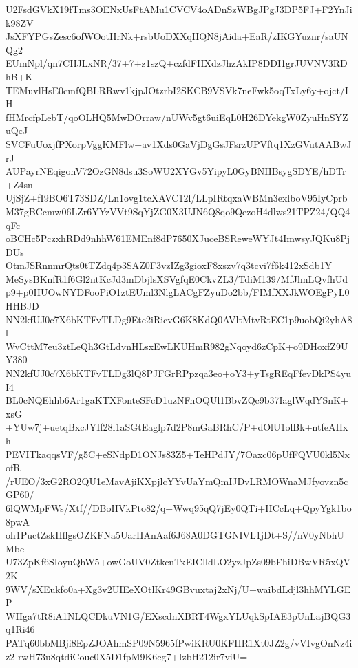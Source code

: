 U2FsdGVkX19fTms3OENxUsFtAMu1CVCV4oADnSzWBgJPgJ3DP5FJ+F2YnJik98ZV
JsXFYPGsZesc6ofWOotHrNk+rsbUoDXXqHQN8jAida+EaR/zIKGYuznr/saUNQg2
EUmNpl/qn7CHJLxNR/37+7+z1szQ+czfdFHXdzJhzAkIP8DDI1grJUVNV3RDhB+K
TEMuvlHsE0cmfQBLRRwv1kjpJOtzrbI2SKCB9VSVk7neFwk5oqTxLy6y+ojct/IH
fHMrcfpLebT/qoOLHQ5MwDOrraw/nUWv5gt6uiEqL0H26DYekgW0ZyuHnSYZuQcJ
SVCFuUoxjfPXorpVggKMFlw+av1Xds0GaVjDgGsJFsrzUPVftq1XzGVutAABwJrJ
AUPayrNEqigonV72OzGN8dsu3SoWU2XYGv5YipyL0GyBNHBsygSDYE/hDTr+Z4sn
UjSjZ+fI9BO6T73SDZ/Ln1ovg1tcXAVC12l/LLpIRtqxaWBMn3exlboV95IyCprb
M37gBCcmw06LZr6YYzVVt9SqYjZG0X3UJN6Q8qo9QezoH4dlws21TPZ24/QQ4qFc
oBCHc5PczxhRDd9nhhW61EMEnf8dP7650XJuceBSReweWYJt4ImwsyJQKu8PjDUs
OtmJSRnnmrQts0tTZdq4p3SAZ0F3vzIZg3gioxF8xszv7q3tcvi7f6k412xSdb1Y
MeSysBKnfR1f6Gl2ntKcJd3mDbjlsXSVgfqE0CkvZL3/TdiM139/MfJhnLQvfhUd
p9+p0HUOwNYDFooPiO1ztEUml3NlgLACgFZyuDo2bb/FIMfXXJkWOEgPyL0HHBJD
NN2kfUJ0c7X6bKTFvTLDg9Etc2iRicvG6K8KdQ0AVltMtvRtEC1p9uobQi2yhA8l
WvCttM7eu3ztLeQh3GtLdvnHLsxEwLKUHmR982gNqoyd6zCpK+o9DHoxfZ9UY380
NN2kfUJ0c7X6bKTFvTLDg3lQ8PJFGrRPpzqa3eo+oY3+yTsgREqFfevDkPS4yuI4
BL0cNQEhhb6Ar1gaKTXFonteSFcD1uzNFnOQUl1BbvZQc9b37IaglWqdYSnK+xsG
+YUw7j+uetqBxcJYIf28l1aSGtEaglp7d2P8mGaBRhC/P+dOlU1olBk+ntfeAHxh
PEVITkaqqsVF/g5C+eSNdpD1ONJs83Z5+TeHPdJY/7Oaxc06pUfFQVU0kl5NxofR
/rUEO/3xG2RO2QU1eMavAjiKXpjlcYYvUaYmQmIJDvLRMOWnaMJfyovzn5cGP60/
6lQWMpFWs/Xtf//DBoHVkPto82/q+Wwq95qQ7jEy0QTi+HCcLq+QpyYgk1bo8pwA
oh1PuctZskHflgsOZKFNa5UarHAnAaf6J68A0DGTGNIVL1jDt+S//nV0yNbhUMbe
U73ZpKf6SIoyuQhW5+owGoUV0ZtkcnTxEIClldLO2yzJpZs09bFhiDBwVR5xQV2K
9WV/sXEukfo0a+Xg3v2UIEeXOtlKr49GBvuxtaj2xNj/U+waibdLdjl3hhMYLGEP
WHga7tR8iA1NLQCDkuVN1G/EXscdnXBRT4WgxYLUqkSpIAE3pUnLajBQG3q1Ri46
PATq60bbMBji8EpZJOAhmSP09N5965fPwiKRU0KFHR1Xt0JZ2g/vVIvgOnNz4iz2
rwH73u8qtdiCouc0X5D1fpM9K6cg7+IzbH212ir7viU=
